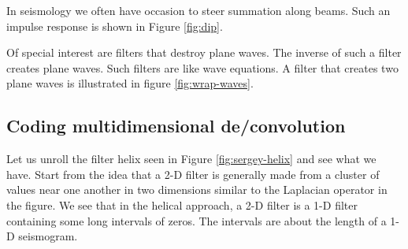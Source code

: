 \par
In seismology we often have occasion to steer summation along beams.
Such an impulse response is shown in Figure \ref{fig:dip}.

Of special interest are filters that destroy plane waves.  The inverse
of such a filter creates plane waves.  Such filters are like wave
equations.  A filter that creates two plane waves is illustrated in
figure \ref{fig:wrap-waves}.


\subsection{Coding multidimensional de/convolution}
Let us unroll the filter helix seen in Figure \ref{fig:sergey-helix}
and see what we have.
Start from the idea that a 2-D filter is generally made
from a cluster of values near one another in two dimensions
similar to the Laplacian operator in the figure.
We see that in the helical approach,
a 2-D filter is a 1-D filter containing some long intervals of zeros.
The intervals are about the length of a 1-D seismogram.

